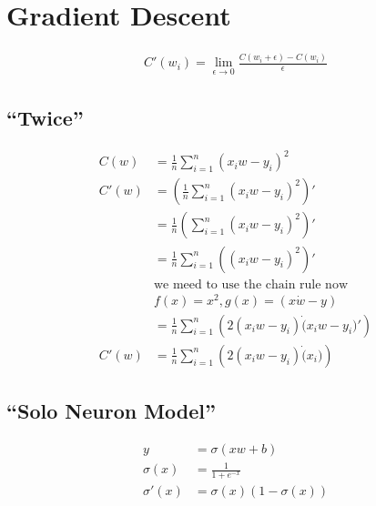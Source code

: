 \documentclass{article}
\begin{document}
\section{Gradient Descent}

\begin{align}
C'(w_i) = \lim_{\epsilon \to 0}\frac{C(w_i + \epsilon) - C(w_i)}{\epsilon}
\end{align}


\subsection{``Twice''}

\begin{align}
    C(w)  &= \frac{1}{n}\sum_{i=1}^{n}(x_iw - y_i)^2 \\
    C'(w) &= \left(\frac{1}{n}\sum_{i=1}^{n}(x_iw - y_i)^2\right)' \\
          &= \frac{1}{n}\left(\sum_{i=1}^{n}(x_iw - y_i)^2\right)' \\
          &= \frac{1}{n}\sum_{i=1}^{n}\left((x_iw - y_i)^2\right)' \\
          & \text{we meed to use the chain rule now} \\
          & f(x) = x^2, g(x) = (x \dot w - y) \\
          &= \frac{1}{n}\sum_{i=1}^{n}\left(2(x_iw - y_i) \dot (x_iw - y_i)'\right) \\
    C'(w) &= \frac{1}{n}\sum_{i=1}^{n}\left(2(x_iw - y_i) \dot (x_i)\right) 
\end{align}

\def\d{1.5}

\subsection{``Solo Neuron Model''}
\begin{center}
\end{center}



\begin{align}
    y &= \sigma(xw + b) \\
    \sigma(x) &= \frac{1}{1 + e^{-x}} \\
    \sigma'(x) &= \sigma(x)(1 - \sigma(x)) 
\end{align}
\end{document}
